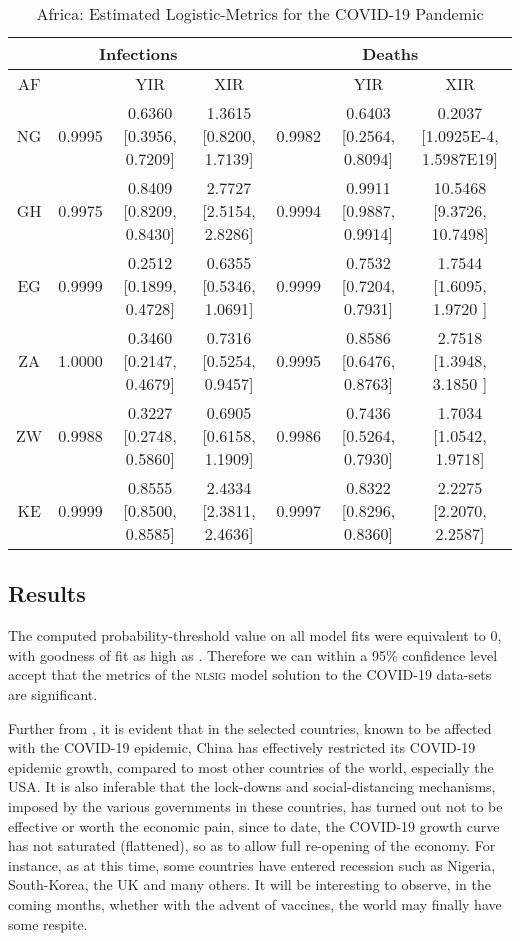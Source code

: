 \documentclass[journal]{IEEEtran}
\theoremstyle{plain}
\theoremstyle{definition}
\theoremstyle{remark}
\begin{document}
\begin{table*}[t]
	\caption{Africa: Estimated Logistic-Metrics for the COVID-19 Pandemic}
	\centering
	\def\arraystretch{1.5}\begin{tabular}{|c|c|c|c|c|c|c|}
	\hline
	\multicolumn{4}{|c||}{Infections}&
	\multicolumn{3}{c|}{Deaths}\\
	\hline\hline
	AF &  & YIR & XIR &  & YIR & XIR \\
	\hline\hline
	NG&  0.9995	
	&  	0.6360 [0.3956, 0.7209]&  1.3615 [0.8200, 1.7139]&  0.9982	&  0.6403 [0.2564, 0.8094]&0.2037 [1.0925E-4, 1.5987E19] \\
	\hline
	GH&  0.9975	
	&  	0.8409 [0.8209, 0.8430]&  2.7727 [2.5154, 2.8286]&  0.9994	&  0.9911	[0.9887, 0.9914]&  10.5468	[9.3726, 10.7498]	\\
	\hline
	EG&  0.9999		
	&  0.2512 [0.1899, 0.4728]&  0.6355 [0.5346,	1.0691]& 0.9999 &  0.7532 [0.7204, 0.7931]& 	1.7544 [1.6095,	1.9720	] \\
	\hline
	ZA&  1.0000	
	&  0.3460 [0.2147, 0.4679]&  0.7316 [0.5254, 0.9457]& 0.9995  & 	0.8586	[0.6476, 0.8763] &  2.7518	[1.3948, 3.1850 ]\\
	\hline
	ZW&  0.9988	
	&  0.3227 [0.2748, 0.5860]&  0.6905 [0.6158, 1.1909]&  0.9986	&  0.7436 [0.5264, 0.7930]& 1.7034	[1.0542,	1.9718]	 \\
	\hline
	KE&  0.9999	
	&  	0.8555 [0.8500,	0.8585]&  2.4334 [2.3811, 2.4636]& 0.9997	 &  0.8322	[0.8296, 0.8360]& 2.2275	[2.2070,	2.2587] \\
	\hline
\end{tabular}
\label{table_africa}
\end{table*}



\subsection{Results}\label{sec_results}
The computed probability-threshold value on all model fits were equivalent to 0, with goodness of fit as high as . Therefore we can within a 95\% confidence level accept that the metrics of the \textsc{nlsig} model solution to the COVID-19 data-sets are significant.

Further from , it is evident that in the selected countries, known to be affected with the COVID-19 epidemic, China has effectively restricted its COVID-19 epidemic growth, compared to most other countries of the world, especially the USA. It is also inferable that the lock-downs and social-distancing mechanisms, imposed by the various governments in these countries, has turned out not to be effective or worth the economic pain, since to date, the COVID-19 growth curve has not saturated (flattened), so as to allow full re-opening of the economy.
For instance, as at this time, some countries have entered recession such as Nigeria, South-Korea, the UK and many others. It will be interesting to observe, in the coming months, whether with the advent of vaccines, the world may finally have some respite.
\end{document}
